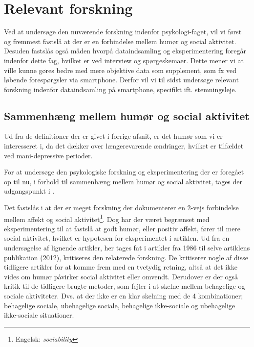 

\chapter{Relevant forskning}
Ved at undersøge den nuværende forskning indenfor psykologi-faget, vil vi først og fremmest fastslå at der er en forbindelse mellem humør og social aktivitet.
Desuden fastslås også måden hvorpå dataindsamling og eksperimentering foregår indenfor dette fag, hvilket er ved interview og spørgeskemaer.
Dette mener vi at ville kunne gøres bedre med mere objektive data som supplement, som fx ved løbende forespørgsler via smartphone.
Derfor vil vi til sidst undersøge relevant forskning indenfor dataindsamling på smartphone, specifikt ift. stemningsleje.

\section{Sammenhæng mellem humør og social aktivitet}
Ud fra de definitioner der er givet i forrige afsnit, er det humør som vi er interesseret i, da det dækker over længerevarende ændringer, hvilket er tilfældet ved mani-depressive perioder.

For at undersøge den psykologiske forskning og eksperimentering der er foregået op til nu, i forhold til sammenhæng mellem humør og social aktivitet, tages der udgangspunkt i \citet{whelan}.

Det fastslås i \citet{whelan} at der er meget forskning der dokumenterer en 2-vejs forbindelse mellem affekt og social aktivitet\footnote{Engelsk: \textit{sociability}}.
Dog har der været begrænset med eksperimentering til at fastslå at godt humør, eller positiv affekt, fører til mere social aktivitet, hvilket er hypotesen for eksperimentet i artiklen.
Ud fra en undersøgelse af lignende artikler, her tages fat i artikler fra 1986 til selve artiklens publikation (2012), kritiseres den relaterede forskning.
De kritiserer nogle af disse tidligere artikler for at komme frem med en tvetydig retning, altså at det ikke vides om humør påvirker social aktivitet eller omvendt.
Derudover er der også kritik til de tidligere brugte metoder, som fejler i at skelne mellem behagelige og sociale aktiviteter.
Dvs. at der ikke er en klar skelning med de 4 kombinationer; behagelige sociale, ubehagelige sociale, behagelige ikke-sociale og ubehagelige ikke-sociale situationer.

